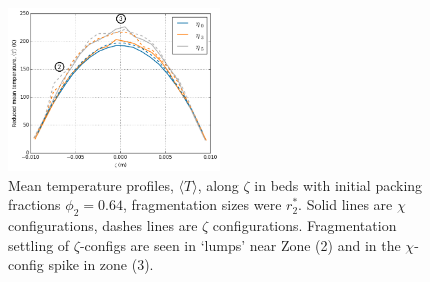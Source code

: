 \begin{figure}[!t]
    \centering
    \includegraphics[width=0.5\textwidth]{figures/64-percent-T-profiles-reduced.png}
    \caption{Mean temperature profiles, $\langle T \rangle$, along $\zeta$ in beds with initial packing fractions $\phi_2 = 0.64$, fragmentation sizes were $r_2^*$. Solid lines are $\chi$ configurations, dashes lines are $\zeta$ configurations. Fragmentation settling of $\zeta$-configs are seen in `lumps' near Zone (2) and in the $\chi$-config spike in zone (3).}
    \label{fig:64-T-profile}
\end{figure}

